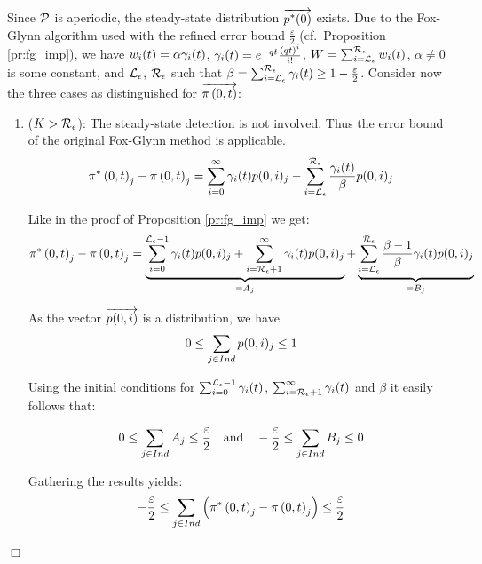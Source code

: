 \documentclass[a4paper,11pt]{article}
\newenvironment{proof}{\trivlist \item[\hskip \labelsep{\bf Proof}]}{\hfill\hbox{$\Box$}\endtrivlist}
\begin{document}
		\begin{proof}
			Since $\mathcal{P}$ is aperiodic, the steady-state distribution $\overrightarrow{p^{*}(0)}$ exists.  Due to the Fox-Glynn algorithm used with the refined error bound $\frac{\varepsilon}{2}$ (cf.\ Proposition \ref{pr:fg_imp}), we have $w_{i}(t) = \alpha \gamma_{i}(t)$, $\gamma_{i}(t) = e^{-q t}\frac{\left( q t \right)^{i}}{i!} $, $W = \sum_{i = \mathcal{L}_{\epsilon}}^{\mathcal{R}_{\epsilon}} w_{i}(t)$, $\alpha \neq 0$ is some constant, and $\mathcal{L}_{\epsilon}$, $\mathcal{R}_{\epsilon}$ such that $\beta = \sum_{i=\mathcal{L}_{\epsilon}}^{\mathcal{R}_{\epsilon}} \gamma_{i}(t) \geq 1 - \frac{\varepsilon}{2}$.
			Consider now the three cases as distinguished for $\overrightarrow{\pi \left(0, t \right )}$:
			\begin{enumerate}
					
				\item ($K > \mathcal{R}_{\epsilon}$):  The steady-state detection is not involved. Thus the error bound of the original Fox-Glynn method is applicable.
					\begin{equation}
						\pi^{*} \left(0, t \right )_{j} - \pi \left(0, t \right )_{j} =\sum_{i=0}^{\infty} \gamma_{i}(t) p(0,i)_{j} - \sum_{i=\mathcal{L}_{\epsilon}}^{\mathcal{R}_{\epsilon}}\frac{\gamma_{i}(t)}{\beta} p(0,i)_{j} \nonumber
					\end{equation}

					Like in the proof of Proposition \ref{pr:fg_imp} we get:
					\begin{equation}
						\pi^{*} \left(0, t \right )_{j} - \pi \left(0, t \right )_{j} = \underbrace{\sum_{i=0}^{\mathcal{L}_{\epsilon}-1} \gamma_{i}(t) p(0,i)_{j} + \sum_{i=\mathcal{R}_{\epsilon}+1}^{\infty} \gamma_{i}(t) p(0,i)_{j}}_{=A_{j}} + \underbrace{\sum_{i=\mathcal{L}_{\epsilon}}^{\mathcal{R}_{\epsilon}}\frac{\beta - 1}{\beta} \gamma_{i}(t) p(0,i)_{j}}_{=B_{j}} \nonumber
					\end{equation}
												
					As the vector $\overrightarrow{p(0,i)}$ is a distribution, we have \[ 0 \leq \sum_{j \in Ind} p(0,i)_{j} \leq 1 \]
					
					Using the initial conditions for $\sum_{i=0}^{\mathcal{L}_{\epsilon}-1} \gamma_{i}(t) $, $\sum_{i=\mathcal{R}_{\epsilon}+1}^{\infty} \gamma_{i}(t) $ and $\beta$ it easily follows that:
					
					$$
						0 \leq \sum_{j \in Ind} A_{j} \leq \frac{\varepsilon}{2} \quad 
						   \text{and} \quad
						- \frac{\varepsilon}{2} \leq \sum_{j \in Ind} B_{j} \leq 0
					$$

					Gathering the results yields:
					\begin{equation}
						- \frac{\varepsilon}{2} \leq \sum_{j \in Ind} \left( \pi^{*} \left(0, t \right )_{j} - \pi \left(0, t \right )_{j} \right) \leq \frac{\varepsilon}{2} \nonumber
					\end{equation}
						

\end{enumerate}
\end{proof}
\end{document}
